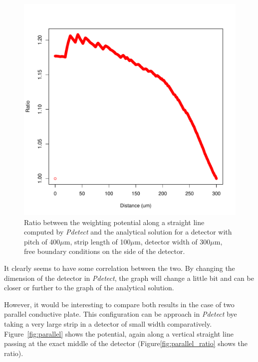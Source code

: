 \documentclass[11pt]{article}
\begin{document}
\begin{figure}[H]
\begin{minipage}[b]{.46\linewidth}
				\includegraphics[scale=0.45]{images/boundary_conditions/semi-free_ratio.pdf}
				\caption{Ratio between the weighting potential along a straight line
						computed by \textit{Pdetect} and the analytical solution for a detector with pitch
						of 400$\mu$m, strip length of 100$\mu$m, detector width of 300$\mu$m, free boundary conditions
						on the side of the detector.}
				\label{fig:semi_free_ratio}
			\end{minipage}
		\end{figure}

		It clearly seems to have some correlation between the two. By changing the dimension of the detector
		in \textit{Pdetect}, the graph will change a little bit and can be closer or further to the graph of the
		analytical solution.

		However, it would be interesting to compare both results in the case of two parallel conductive plate.
		This configuration can be approach in \textit{Pdetect} bye taking a very large strip in a detector of small
		width comparatively. Figure~\ref{fig:parallel} shows the potential, again along a vertical straight line passing
		at the exact middle of the detector (Figure\ref{fig:parallel_ratio} shows the ratio).
\end{document}
